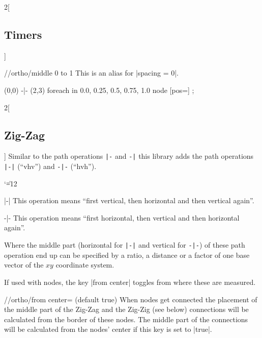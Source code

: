 \begin{multicols*}{2}[\subsection{Timers}]
\newcolumn
\begin{key}{/\tikzext/ortho/middle 0 to 1}
  This is an alias for |spacing = 0|.
\end{key}

\begin{codeexample}[width=4cm,preamble=\usetikzlibrary{ext.paths.ortho}]
\tikz \draw (0,0) -|- (2,3) 
  foreach \p in {0.0, 0.25, 0.5, 0.75, 1.0}{
    node [pos=\p] {\p}};
\end{codeexample}
\end{multicols*}

\pagebreak
\begin{multicols*}{2}[\subsection{Zig-Zag}]
Similar to the path operations \verb!|-! and \verb!-|! this library adds\indexPathOperationO{\protect\pgfmanualbar-}\indexPathOperationO{-\protect\pgfmanualbar}
the path operations \verb!|-|! (\enquote{vhv}) and \verb!-|-! (\enquote{hvh}).
{\catcode`\|=12
\begin{pathoperation}[noindex]{|-|}{}
    \pgfmanualpdflabel[\catcode`\|=12 ]{|-|}{}%
    This operation means ``first vertical, then horizontal and then vertical again''.
\end{pathoperation}
\begin{pathoperation}[noindex]{-|-}{}
    \pgfmanualpdflabel[\catcode`\|=12 ]{-|-}{}%
    This operation means ``first horizontal, then vertical and then horizontal again''.
\end{pathoperation}
}

Where the middle part (horizontal for \verb!|-|! and vertical for \verb!-|-!)
of these path operation end up can be specified by a ratio, a distance or
a factor of one base vector of the $x\!y$ coordinate system.

If used with nodes, the key |from center| toggles from where these are measured.
\begin{key}{/\tikzext/ortho/from center= (default true)}
  When nodes get connected the placement of the middle part of the Zig-Zag
  and the Zig-Zig (see below) connections will be calculated from the border
  of these nodes.
  The middle part of the connections will be calculated from the nodes' center
  if this key is set to |true|.
\end{key}


\end{multicols*}
